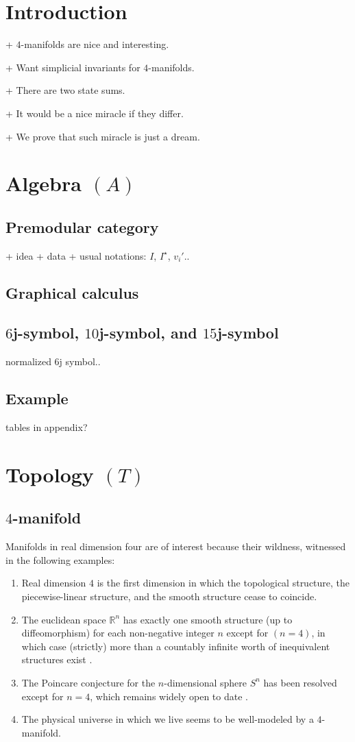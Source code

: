 \section{Introduction}

+ $4$-manifolds are nice and interesting.

+ Want simplicial invariants for $4$-manifolds.

+ There are two state sums.

+ It would be a nice miracle if they differ.

+ We prove that such miracle is just a dream.

\section{Algebra $(A)$}
\subsection{Premodular category}
+ idea
+ data
+ usual notations: $I$, $I^{\star}$, $v_{i}'$..
\subsection{Graphical calculus}
\subsection{$6$j-symbol, $10$j-symbol, and $15$j-symbol}
normalized $6$j symbol..
\subsection{Example}
tables in appendix?

\section{Topology $(T)$}
\subsection{$4$-manifold}
Manifolds in real dimension four are of interest because their
wildness, witnessed in the following examples:

\begin{enumerate}
  \item Real dimension $4$ is the first dimension in which the
        topological structure, the piecewise-linear structure,
        and the smooth structure cease to coincide.
  \item The euclidean space $\mathbb{R}^{n}$ has exactly one
        smooth structure (up to diffeomorphism) for each
        non-negative integer $n$ except for $(n=4)$, in which
        case (strictly) more than a countably infinite worth of
        inequivalent structures exist \cite{?}.
  \item The Poincare conjecture for the $n$-dimensional sphere
        $S^{n}$ has been resolved except for $n=4$, which remains
        widely open to date \cite{?}.
  \item The physical universe in which we live seems to be
        well-modeled by a $4$-manifold.
\end{enumerate}

